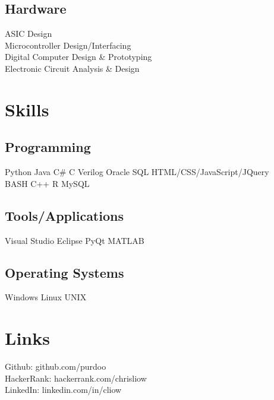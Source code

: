 \documentclass[letterpaper]{deedy-resume} %
\begin{document}
\begin{minipage}[t]{0.33\textwidth}
\subsection{Hardware}
ASIC Design \\
Microcontroller Design/Interfacing \\
Digital Computer Design \& Prototyping \\
Electronic Circuit Analysis \& Design \\

\sectionspace %


\section{Skills}

\subsection{Programming}

Python \textbullet{} Java \textbullet{} C\# \textbullet{} C \textbullet{} Verilog \textbullet{} Oracle SQL \textbullet{} HTML/CSS/JavaScript/JQuery \textbullet{} \\
BASH \textbullet{} C++ \textbullet{} R \textbullet{} MySQL \textbullet{}\\
\sectionspace

\subsection{Tools/Applications}
Visual Studio \textbullet{} Eclipse \textbullet{} PyQt \textbullet{} MATLAB

\sectionspace
\subsection{Operating Systems}
Windows \textbullet{} Linux \textbullet{} UNIX

\sectionspace %

\section{Links} 

Github: github.com/purdoo \\
HackerRank: hackerrank.com/chrisliow \\
LinkedIn: linkedin.com/in/cliow \\


\sectionspace %


\end{minipage} %
\end{document}
